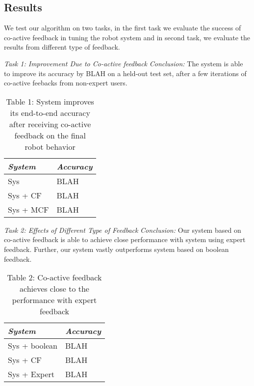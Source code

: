 \subsection{Results} 
We test our algorithm on two tasks, in the first task we evaluate the success of co-active feedback in tuning the robot system and in second task, we evaluate the results from different type of feedback.

\noindent\textit{Task 1: Improvement Due to Co-active feedback}
\textit{Conclusion:} The system is able to improve its accuracy by BLAH on a held-out test set, after a few iterations of co-active feebacks from non-expert users.

\begin{table}
\label{tbl:tsk1}
\caption{Table 1: System improves its end-to-end accuracy after receiving co-active feedback on the final robot behavior}
\centering
\begin{tabular}{|l|l|}
\hline
\textit{System} & \textit{Accuracy} \\
\hline
Sys & BLAH \\
Sys + CF & BLAH \\
Sys + MCF & BLAH \\
\hline
\end{tabular}
\end{table}

\noindent\textit{Task 2: Effects of Different Type of Feedback}
\textit{Conclusion:} Our system based on co-active feedback is able to achieve close performance with system using expert feedback. Further, our system vastly outperforms system based on boolean feedback.

\begin{table}
\label{tbl:tsk2}
\caption{Table 2: Co-active feedback achieves close to the performance with expert feedback}
\centering
\begin{tabular}{|l|l|}
\hline
\textit{System} & \textit{Accuracy} \\
\hline
Sys + boolean & BLAH\\
Sys + CF & BLAH \\
Sys + Expert & BLAH \\
\hline
\end{tabular}
\end{table}


